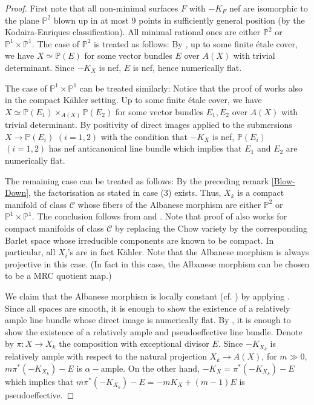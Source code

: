 \documentclass[a4, 12pt]{amsart}
\numberwithin{equation}{section}
\theoremstyle{definition}
\def\P{\mathbb{P}}
\def\P{\mathbb{P}}
\begin{document}
\begin{proof}
First note that all non-minimal surfaces $F$ with $-K_F$ nef are isomorphic to the
plane $\P^2$ blown up in at most 9 points in sufficiently general position (by the Kodaira-Enriques classification).
All minimal rational ones are either $\P^2$ or $\P^1 \times \P^1$.
The case of $\P^2$ is treated as follows:
By \cite[Lemma 7.4]{CP91}, up to some finite \'etale cover, we have $X \simeq \P(E) $ for some vector bundles $E$ over $A(X)$ with trivial determinant.
Since $-K_X$ is nef, $E$ is nef, hence numerically flat. 

The case of $\P^1 \times \P^1$ can be treated similarly:
Notice that the proof of \cite[Lemma 9.4]{CP91} works also in the compact K\"ahler setting.
Up to some finite \'etale cover, we have $X \simeq \P(E_1) \times_{A(X)} \P(E_2)$ for some vector bundles $E_1,E_2$ over $A(X)$ with trivial determinant.
By positivity of direct images applied to the submersions $X \to \P(E_i)$ $(i=1,2)$ with the condition that $-K_X$ is nef,
$\P(E_i)$ $(i=1,2)$ has nef anticanonical line bundle which implies that $E_1$ and $E_2$ are numerically flat.

The remaining case can be treated as follows:
By the preceding remark \ref{Blow-Down}, the factorisation as stated in case (3) exists.
Thus, $X_k$ is a compact manifold of class $\mathcal{C}$
whose fibers of the Albanese morphism are either $\P^2$ or $\P^1 \times \P^1$.
The conclusion follows from \cite[Lemma 9.4]{CP91} and \cite{El82}.
Note that proof of \cite[Lemma 9.4]{CP91} also works for compact manifolds of class $\mathcal{C}$ by replacing the Chow variety by the corresponding Barlet space whose irreducible components are known to be compact.
In particular, all $X_i$'s are in fact K\"ahler.
Note that the Albanese morphism is always projective in this case.
(In fact in this case, the Albanese morphism can be chosen to be a MRC quotient map.)

We claim that the Albanese morphism is locally constant (cf. \cite[Definition 2.3]{MW}) by applying \cite[Proposition 2.5]{MW}.
Since all spaces are smooth, it is enough to show the existence of a relatively ample line bundle whose direct image is numerically flat.
By \cite[Theorem 2.6]{MW23}, it is enough to show the existence of a relatively ample and pseudoeffective line bundle.
Denote by $\pi: X \to X_k$ the composition with exceptional divisor $E$.
Since $-K_{X_k}$ is relatively ample with respect to the natural projection $X_k \to A(X)$, for $m \gg 0$, $m \pi^* (-K_{X_k})-E$ is $\alpha-$ample.
On the other hand, $-K_X=\pi^*(-K_{X_k})-E$ which implies that $m \pi^* (-K_{X_k})-E=-mK_X+(m-1)E$ is pseudoeffective.
\end{proof}
\end{document}
